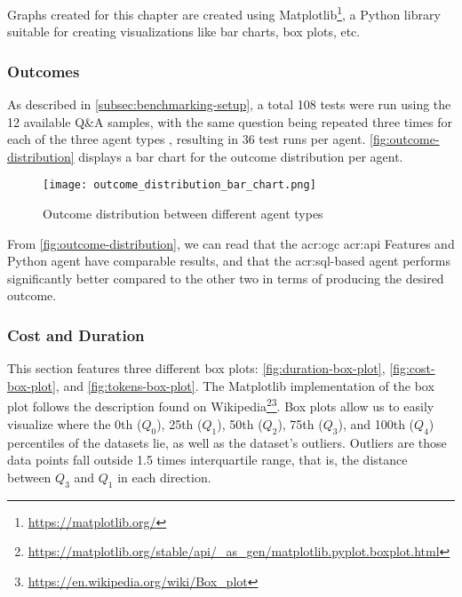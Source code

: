 Graphs created for this chapter are created using Matplotlib\footnote{\url{https://matplotlib.org/}}, a Python library suitable for creating visualizations like bar charts, box plots, etc.

\subsubsection{Outcomes}

As described in \autoref{subsec:benchmarking-setup}, a total 108 tests were run using the 12 available Q\&A samples, with the same question being repeated three times for each of the three agent types , resulting in 36 test runs per agent. \autoref{fig:outcome-distribution} displays a bar chart for the outcome distribution per agent.


\begin{figure}[htbp]
    \centering
    \texttt{[image: outcome\_distribution\_bar\_chart.png]}
    \caption{Outcome distribution between different agent types}
    \label{fig:outcome-distribution}
\end{figure}

From \autoref{fig:outcome-distribution}, we can read that the \acrshort{acr:ogc} \acrshort{acr:api} Features and Python agent have comparable results, and that the \acrshort{acr:sql}-based agent performs significantly better compared to the other two in terms of producing the desired outcome.

\subsubsection{Cost and Duration}

This section features three different box plots: \autoref{fig:duration-box-plot}, \autoref{fig:cost-box-plot}, and \autoref{fig:tokens-box-plot}. The Matplotlib implementation of the box plot follows the description found on Wikipedia\footnote{\url{https://matplotlib.org/stable/api/_as_gen/matplotlib.pyplot.boxplot.html}}\footnote{\url{https://en.wikipedia.org/wiki/Box_plot}}. Box plots allow us to easily visualize where the 0th ($Q_0$), 25th ($Q_1$), 50th ($Q_2$), 75th ($Q_3$), and 100th ($Q_4$) percentiles of the datasets lie, as well as the dataset's outliers. Outliers are those data points fall outside 1.5 times interquartile range, that is, the distance between $Q_3$ and $Q_1$ in each direction.

